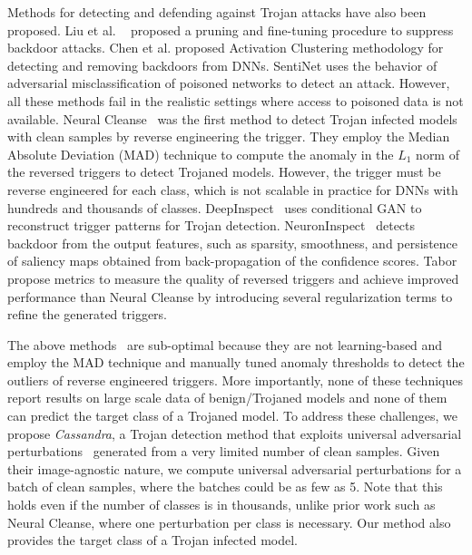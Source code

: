 \documentclass{article}
\begin{document}
Methods for detecting and defending against Trojan attacks have also been proposed. Liu et al. ~\cite{liu2018fine} proposed a pruning and fine-tuning procedure to suppress backdoor attacks.  Chen et al. \cite{chen2018detecting} proposed Activation Clustering methodology for detecting and removing backdoors from DNNs. SentiNet\cite{chou2018sentinet} uses the behavior of adversarial misclassification of poisoned networks to detect an attack. However, all these methods fail in the realistic settings where access to poisoned data is not available.
Neural Cleanse~\cite{wang2019neural} was the first  method to detect Trojan infected models with clean samples by reverse engineering the trigger. They employ the Median Absolute Deviation (MAD) technique to  compute the anomaly in the $L_1$ norm of the reversed triggers to detect Trojaned models. However,  the trigger must be reverse engineered  for each class, which is not scalable in practice for DNNs with hundreds and thousands of classes.  DeepInspect~\cite{chen2019deepinspect} uses conditional GAN to reconstruct trigger patterns for Trojan detection.
NeuronInspect~\cite{huang2019neuroninspect} detects backdoor from the output features, such as sparsity, smoothness, and persistence of saliency maps obtained from back-propagation of the confidence scores. 
 Tabor~\cite{guo2019tabor} propose metrics to measure the quality of reversed triggers  and achieve improved performance than Neural Cleanse by introducing several regularization terms to refine the generated triggers. 


The above methods~\cite{wang2019neural,chen2019deepinspect,huang2019neuroninspect} 
are sub-optimal because they are not learning-based and employ the MAD technique and manually tuned anomaly thresholds to detect the outliers of reverse engineered triggers. More importantly, none of these techniques report results on large scale data of benign/Trojaned models and none of them can predict the target class of a Trojaned model. To address these challenges, we propose {\it Cassandra}, a Trojan detection method that exploits universal adversarial perturbations~\cite{Khrulkov_2018_CVPR} generated from a very limited number of clean samples. Given their image-agnostic nature, we compute universal adversarial perturbations for a batch of clean samples, where the batches could be as few as 5. Note that this holds even if the number of classes is in thousands, unlike prior work such as Neural Cleanse, where one perturbation per class is necessary. Our method also provides the target class of a Trojan infected model.
\end{document}
